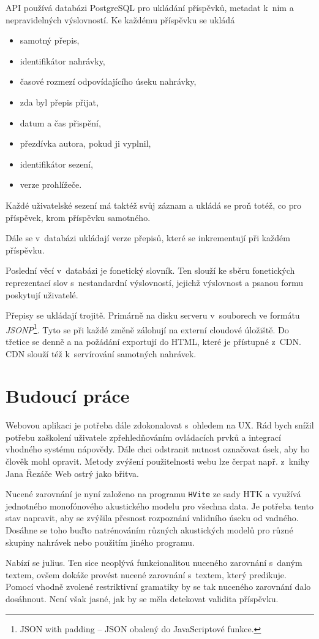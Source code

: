 API používá databázi PostgreSQL pro ukládání příspěvků, metadat k~nim a nepravidelných
výslovností. Ke každému příspěvku se ukládá
\begin{itemize}
\item{samotný přepis,}
\item{identifikátor nahrávky,}
\item{časové rozmezí odpovídajícího úseku nahrávky,}
\item{zda byl přepis přijat,}
\item{datum a čas přispění,}
\item{přezdívka autora, pokud ji vyplnil,}
\item{identifikátor sezení,}
\item{verze prohlížeče.}
\end{itemize}

Každé uživatelské sezení má taktéž svůj záznam a ukládá se proň totéž, co pro
příspěvek, krom příspěvku samotného.

Dále se v~databázi ukládají verze přepisů, které se inkrementují při každém
příspěvku.

Poslední věcí v~databázi je fonetický slovník. Ten slouží ke sběru fonetických
reprezentací slov s~nestandardní výslovností, jejichž výslovnost a psanou formu
poskytují uživatelé.

Přepisy se ukládají trojitě. Primárně na disku serveru v~souborech ve formátu {\em
JSONP}\footnote{JSON with padding -- JSON obalený do JavaScriptové funkce.}.
Tyto se při každé změně zálohují na externí cloudové úložiště. Do třetice se
denně a na požádání exportují do HTML, které je přístupné z~CDN.
CDN slouží též k~servírování samotných nahrávek.


\section{Budoucí práce}

Webovou aplikaci je potřeba dále zdokonalovat s~ohledem na UX. Rád bych
snížil potřebu zaškolení uživatele zpřehledňováním ovládacích prvků a
integrací vhodného systému nápovědy. Dále chci odstranit nutnost označovat
úsek, aby ho člověk mohl opravit.
Metody zvýšení použitelnosti webu lze čerpat např. z~knihy Jana Řezáče Web
ostrý jako břitva\cite{rezac2016web}.

Nucené zarovnání je nyní založeno na programu \texttt{HVite} ze sady HTK a
využívá jednotného monofónového akustického modelu pro všechna data. Je
potřeba tento stav napravit, aby se zvýšila přesnost rozpoznání validního úseku
od vadného. Dosáhne se toho buďto natrénováním různých akustických modelů pro
různé skupiny nahrávek nebo použitím jiného programu.

Nabízí se julius. Ten sice neoplývá funkcionalitou nuceného zarovnání s~daným
textem, ovšem dokáže provést nucené zarovnání s~textem, který predikuje. Pomocí
vhodně zvolené restriktivní gramatiky by se tak nuceného zarovnání dalo
dosáhnout. Není však jasné, jak by se měla detekovat validita příspěvku.
